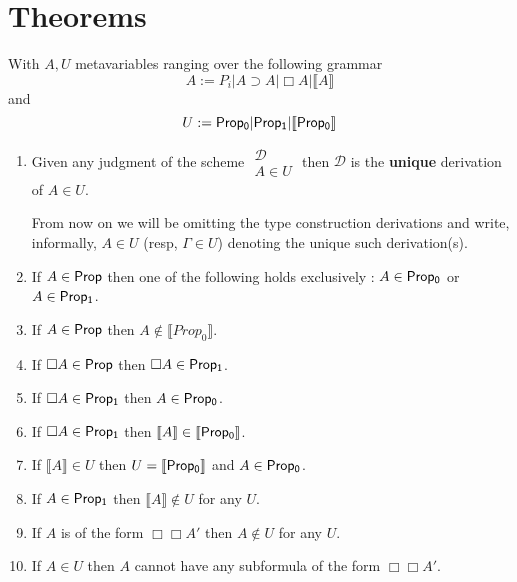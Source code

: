 \section{Theorems}
\begin{proposition}
\label{bftu}
With $A, U$ metavariables ranging over the following grammar
$$ A:= P_i |  A \supset  A |\Box  A | \llbracket A \rrbracket  $$
and $$U:={\sf Prop_0}| {\sf Prop_1} | {\sf \llbracket Prop_0\rrbracket}$$
\begin{enumerate}
\item Given  any judgment of the scheme  $\begin{array}{c}
         {\mathcal{ D}} \\
           A \in U
        \end{array}$ then $\mathcal{D}$ is the \textbf{unique} derivation of $ A \in U$. 

From now on we will be omitting the type construction derivations and write, informally, $ A\in U$ (resp, $\Gamma\in U$) denoting the unique such derivation(s). 

\item If $ A \in {\sf Prop}$ then one of the following holds exclusively : $ A \in {\sf Prop_0}$ or ${ A \in {\sf Prop_1}}$.
\item If $A \in {\sf Prop}$ then $A \not\in\llbracket Prop_0\rrbracket$.
\item If $\Box  A \in {\sf Prop}$ then $\Box  A \in {\sf Prop_1}$.
\item If $\Box  A \in {\sf Prop_1}$ then $ A \in {\sf Prop_0}$.
\item If $\Box  A \in {\sf Prop_1}$ then  $\llbracket  A\rrbracket \in { \llbracket {\sf Prop_0}\rrbracket}$.
\item If $\llbracket  A \rrbracket \in U$ then $ U = { \llbracket {\sf Prop_0}\rrbracket } $ and $A\in {\sf Prop_0}$.

\item If $A \in {\sf Prop_1}$ then $\llbracket A \rrbracket \not \in U$ for any $U$.
\item If $ A$ is of the form $\Box\Box  A'$ then $ A\not\in U$ for any $U$.
\item If $A\in U$ then $A$ cannot have any subformula of the form  $\Box\Box A'$. 
\end{enumerate}
\end{proposition}
